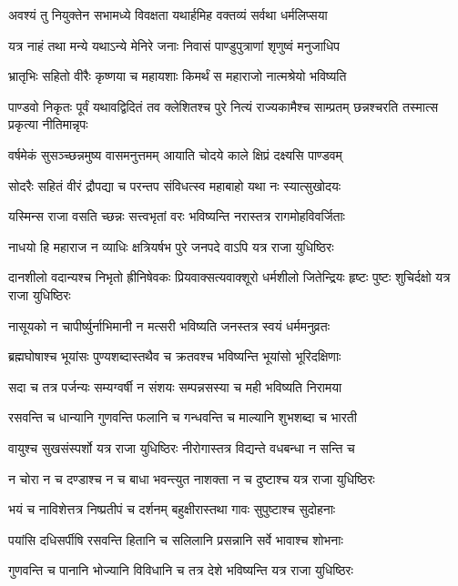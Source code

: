 \twolineshloka
{अवश्यं तु नियुक्तेन सभामध्ये विवक्षता}
{यथार्हमिह वक्तव्यं सर्वथा धर्मलिप्सया}


\twolineshloka
{यत्र नाहं तथा मन्ये यथाऽन्ये मेनिरे जनाः}
{निवासं पाण्डुपुत्राणां शृणुष्वं मनुजाधिप}


\twolineshloka
{भ्रातृभिः सहितो वीरैः कृष्णया च महायशाः}
{किमर्थं स महाराजो नात्मश्रेयो भविष्यति}


\threelineshloka
{पाण्डवो निकृतः पूर्वं यथावद्विदितं तव}
{क्लेशितश्च पुरे नित्यं राज्यकामैश्च साम्प्रतम्}
{छन्नश्चरति तस्मात्स प्रकृत्या नीतिमान्नृपः}


\twolineshloka
{वर्षमेकं सुसञ्च्छन्नमुष्य वासमनुत्तमम्}
{आयाति चोदये काले क्षिप्रं दक्ष्यसि पाण्डवम्}


\twolineshloka
{सोदरैः सहितं वीरं द्रौपद्या च परन्तप}
{संविधत्स्व महाबाहो यथा नः स्यात्सुखोदयः}


\twolineshloka
{यस्मिन्स राजा वसति च्छन्नः सत्त्वभृतां वरः}
{भविष्यन्ति नरास्तत्र रागमोहविवर्जिताः}


\twolineshloka
{नाधयो हि महाराज न व्याधिः क्षत्रियर्षभ}
{पुरे जनपदे वाऽपि यत्र राजा युधिष्ठिरः}


\threelineshloka
{दानशीलो वदान्यश्च निभृतो ह्रीनिषेवकः}
{प्रियवाक्सत्यवाक्शूरो धर्मशीलो जितेन्द्रियः}
{हृष्टः पुष्टः शुचिर्दक्षो यत्र राजा युधिष्ठिरः}


\twolineshloka
{नासूयको न चापीर्ष्युर्नाभिमानी न मत्सरी}
{भविष्यति जनस्तत्र स्वयं धर्ममनुव्रतः}


\twolineshloka
{ब्रह्मघोषाश्च भूयांसः पुण्यशब्दास्तथैव च}
{क्रतवश्च भविष्यन्ति भूयांसो भूरिदक्षिणाः}


\twolineshloka
{सदा च तत्र पर्जन्यः सम्यग्वर्षी न संशयः}
{सम्पन्नसस्या च मही भविष्यति निरामया}


\twolineshloka
{रसवन्ति च धान्यानि गुणवन्ति फलानि च}
{गन्धवन्ति च माल्यानि शुभशब्दा च भारती}


\twolineshloka
{वायुश्च सुखसंस्पर्शो यत्र राजा युधिष्ठिरः}
{नीरोगास्तत्र विद्यन्ते वधबन्धा न सन्ति च}


\twolineshloka
{न चोरा न च दण्डाश्च न च बाधा भवन्त्युत}
{नाशक्ता न च दुष्टाश्च यत्र राजा युधिष्ठिरः}


\twolineshloka
{भयं च नाविशेत्तत्र निष्प्रतीपं च दर्शनम्}
{बहुक्षीरास्तथा गावः सुपुष्टाश्च सुदोहनाः}


\twolineshloka
{पयांसि दधिसर्पीषि रसवन्ति हितानि च}
{सलिलानि प्रसन्नानि सर्वे भावाश्च शोभनाः}


\twolineshloka
{गुणवन्ति च पानानि भोज्यानि विविधानि च}
{तत्र देशे भविष्यन्ति यत्र राजा युधिष्ठिरः}


